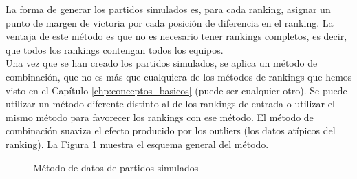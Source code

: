 La forma de generar los partidos simulados es, para cada ranking, asignar un punto de margen de victoria por cada posición de diferencia en el ranking. La ventaja de este método es que no es necesario tener rankings completos, es decir, que todos los rankings contengan todos los equipos. \\

Una vez que se han creado los partidos simulados, se aplica un método de combinación, que no es más que cualquiera de los métodos de rankings  que hemos visto en el Capítulo \ref{chp:conceptos_basicos} (puede ser cualquier otro). Se puede utilizar un método diferente distinto al de los rankings de entrada o utilizar el mismo método para favorecer los rankings con ese método. El método de combinación suaviza el efecto producido por los outliers (los datos atípicos del ranking). La Figura \ref{fig:partidos_simulados} muestra el esquema general del método.

\begin{figure}[htb]
\centering
\partidossimulados
\caption{Método de datos de partidos simulados}
\label{fig:partidos_simulados}
\end{figure}

